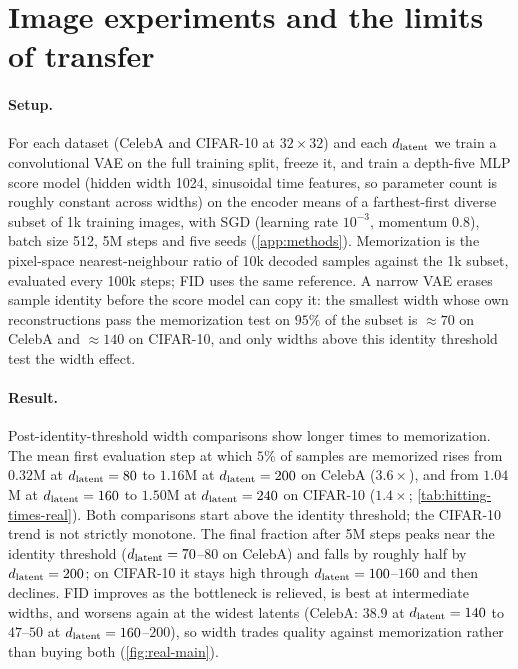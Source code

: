 \section{Image experiments and the limits of transfer}
\label{sec:real}\label{sec:real-data}\label{sec:spectral-predictor}

\paragraph{Setup.}
For each dataset (CelebA and CIFAR-10 at $32\times32$) and each $d_{\mathrm{latent}}$ we train a convolutional VAE on the full training split, freeze it, and train a depth-five MLP score model (hidden width 1024, sinusoidal time features, so parameter count is roughly constant across widths) on the encoder means of a farthest-first diverse subset of 1k training images, with SGD (learning rate $10^{-3}$, momentum $0.8$), batch size 512, 5M steps and five seeds (\cref{app:methods}). Memorization is the pixel-space nearest-neighbour ratio of 10k decoded samples against the 1k subset, evaluated every 100k steps; FID uses the same reference. A narrow VAE erases sample identity before the score model can copy it: the smallest width whose own reconstructions pass the memorization test on $95\%$ of the subset is $\approx70$ on CelebA and $\approx140$ on CIFAR-10, and only widths above this identity threshold test the width effect.

\paragraph{Result.}
Post-identity-threshold width comparisons show longer times to memorization. The mean first evaluation step at which $5\%$ of samples are memorized rises from $0.32$M at $d_{\mathrm{latent}}=80$ to $1.16$M at $d_{\mathrm{latent}}=200$ on CelebA ($3.6\times$), and from $1.04$M at $d_{\mathrm{latent}}=160$ to $1.50$M at $d_{\mathrm{latent}}=240$ on CIFAR-10 ($1.4\times$; \cref{tab:hitting-times-real}). Both comparisons start above the identity threshold; the CIFAR-10 trend is not strictly monotone. The final fraction after 5M steps peaks near the identity threshold ($d_{\mathrm{latent}}=70$--$80$ on CelebA) and falls by roughly half by $d_{\mathrm{latent}}=200$; on CIFAR-10 it stays high through $d_{\mathrm{latent}}=100$--$160$ and then declines. FID improves as the bottleneck is relieved, is best at intermediate widths, and worsens again at the widest latents (CelebA: $38.9$ at $d_{\mathrm{latent}}=140$ to $47$--$50$ at $d_{\mathrm{latent}}=160$--$200$), so width trades quality against memorization rather than buying both (\cref{fig:real-main}).

